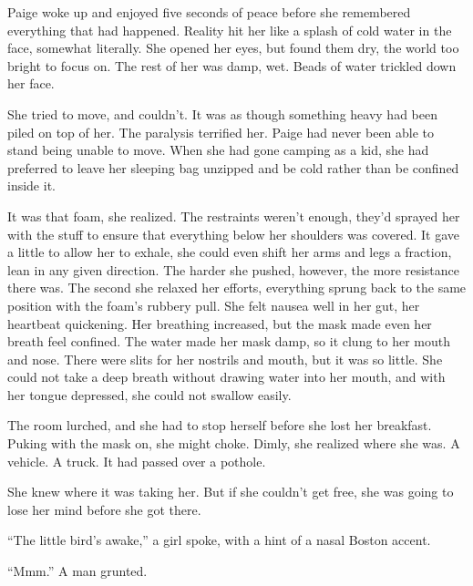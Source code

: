 \sectionbreak



Paige woke up and enjoyed five seconds of peace before she remembered everything that had happened.  Reality hit her like a splash of cold water in the face, somewhat literally.  She opened her eyes, but found them dry, the world too bright to focus on.  The rest of her was damp, wet.  Beads of water trickled down her face.



She tried to move, and couldn't.  It was as though something heavy had been piled on top of her.  The paralysis terrified her.  Paige had never been able to stand being unable to move.  When she had gone camping as a kid, she had preferred to leave her sleeping bag unzipped and be cold rather than be confined inside it.



It was that foam, she realized.  The restraints weren't enough, they'd sprayed her with the stuff to ensure that everything below her shoulders was covered.  It gave a little to allow her to exhale, she could even shift her arms and legs a fraction, lean in any given direction. The harder she pushed, however, the more resistance there was.  The second she relaxed her efforts, everything sprung back to the same position with the foam's rubbery pull.  She felt nausea well in her gut, her heartbeat quickening.  Her breathing increased, but the mask made even her breath feel confined.  The water made her mask damp, so it clung to her mouth and nose.  There were slits for her nostrils and mouth, but it was so little.  She could not take a deep breath without drawing water into her mouth, and with her tongue depressed, she could not swallow easily.



The room lurched, and she had to stop herself before she lost her breakfast.  Puking with the mask on, she might choke.  Dimly, she realized where she was.  A vehicle.  A truck.  It had passed over a pothole.



She knew where it was taking her.  But if she couldn't get free, she was going to lose her mind before she got there.



``The little bird's awake,'' a girl spoke, with a hint of a nasal Boston accent.



``Mmm.''  A man grunted.




